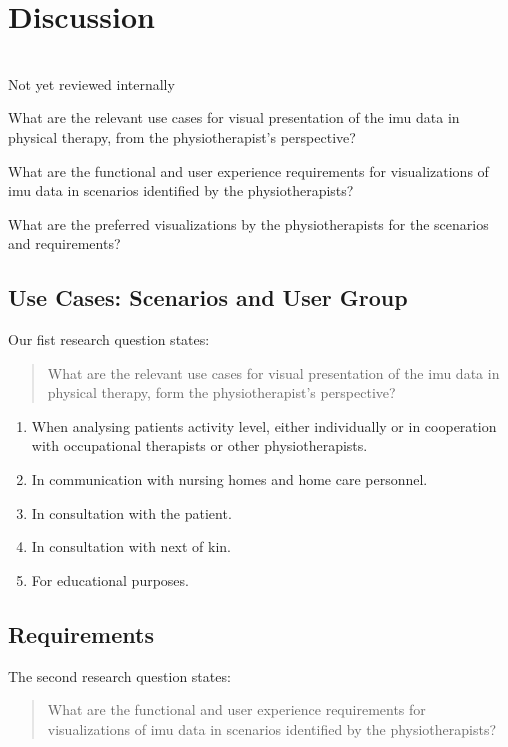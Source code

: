 \chapter{Discussion}
\\Not yet reviewed internally

\begin{description}[parsep=0pt, itemsep=0pt]
\item[Research Question 1:] What are the relevant use cases for visual presentation of the \gls{imu} data in physical therapy, from the physiotherapist's perspective?

\item[Research Question 2:] What are the functional and user experience requirements for visualizations of \gls{imu} data in scenarios identified by the physiotherapists?

\item[Research Question 3:] What are the preferred visualizations by the physiotherapists for the scenarios and requirements?
\end{description}

\section{Use Cases: Scenarios and User Group}
Our fist research question states:
\begin{quote}
What are the relevant use cases for visual presentation of the \gls{imu} data in physical therapy, form the physiotherapist's perspective?
\end{quote}

\begin{enumerate}[itemsep=0cm, parsep=0cm]
\item When analysing patients activity level, either individually or in cooperation with occupational therapists or other physiotherapists.
\item In communication with nursing homes and home care personnel.
\item In consultation with the patient.
\item In consultation with next of kin.
\item For educational purposes.
\end{enumerate}

\section{Requirements}
The second research question states:
\begin{quote}
What are the functional and user experience requirements for visualizations of \gls{imu} data in scenarios identified by the physiotherapists?
\end{quote}

